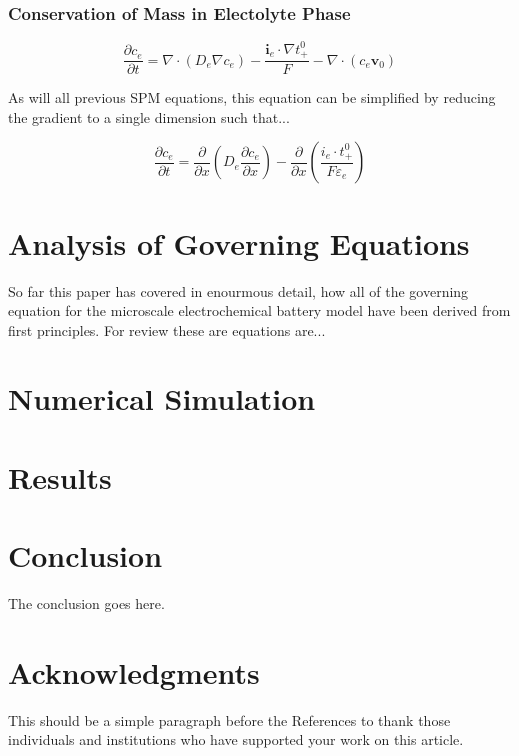 \documentclass[lettersize,journal]{IEEEtran}
\begin{document}
\subsubsection{Conservation of Mass in Electolyte Phase}


\begin{equation}
\frac{\partial c_{e}}{\partial t}=\nabla \cdot\left(D_{e} \nabla c_{e}\right)-\frac{\mathbf{i}_{e} \cdot \nabla t_{+}^{0}}{F}-\nabla \cdot\left(c_{e} \mathbf{v}_{0}\right)
\end{equation}

As will all previous SPM equations, this equation can be simplified by reducing the gradient to a single dimension such that...

\begin{equation}
\frac{\partial c_{e}}{\partial t}= \frac{\partial}{\partial{x}} \left( D_e \frac{\partial{c_e}}{\partial{x}} \right) - \frac{\partial}{\partial{x}}\left( \frac{i_e \cdot t_{+}^{0}}{F\varepsilon_e} \right)
\end{equation}

\section{Analysis of Governing Equations}

So far this paper has covered in enourmous detail, how all of the governing equation for the microscale electrochemical battery model have been derived from first principles. For review these are equations are...



\section{Numerical Simulation}

\section{Results}

\section{Conclusion}
The conclusion goes here.


\section*{Acknowledgments}
This should be a simple paragraph before the References to thank those individuals and institutions who have supported your work on this article.
\end{document}
